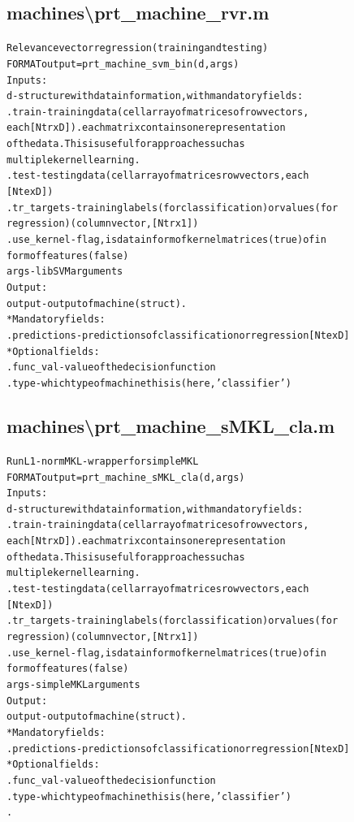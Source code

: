 \subsection{machines\textbackslash prt\_machine\_rvr.m}
\begin{alltt}

 Relevance vector regression (training and testing)
 FORMAT output = prt\_machine\_svm\_bin(d,args)
 Inputs:
   d         - structure with data information, with mandatory fields:
     .train      - training data (cell array of matrices of row vectors,
                   each [Ntr x D]). each matrix contains one representation
                   of the data. This is useful for approaches such as
                   multiple kernel learning.
     .test       - testing data  (cell array of matrices row vectors, each
                   [Nte x D])
     .tr\_targets - training labels (for classification) or values (for
                   regression) (column vector, [Ntr x 1])
     .use\_kernel - flag, is data in form of kernel matrices (true) of in
                form of features (false)
    args     - libSVM arguments
 Output:
    output  - output of machine (struct).
     * Mandatory fields:
      .predictions - predictions of classification or regression [Nte x D]
     * Optional fields:
      .func\_val - value of the decision function
      .type     - which type of machine this is (here, 'classifier')
\end{alltt}


\subsection{machines\textbackslash prt\_machine\_sMKL\_cla.m}
\begin{alltt}

 Run L1-norm MKL - wrapper for simpleMKL
 FORMAT output = prt\_machine\_sMKL\_cla(d,args)
 Inputs:
   d         - structure with data information, with mandatory fields:
     .train      - training data (cell array of matrices of row vectors,
                   each [Ntr x D]). each matrix contains one representation
                   of the data. This is useful for approaches such as
                   multiple kernel learning.
     .test       - testing data  (cell array of matrices row vectors, each
                   [Nte x D])
     .tr\_targets - training labels (for classification) or values (for
                   regression) (column vector, [Ntr x 1])
     .use\_kernel - flag, is data in form of kernel matrices (true) of in 
                form of features (false)
    args     - simpleMKL arguments
 Output:
    output  - output of machine (struct).
     * Mandatory fields:
      .predictions - predictions of classification or regression [Nte x D]
     * Optional fields:
      .func\_val - value of the decision function
      .type     - which type of machine this is (here, 'classifier')
      .
\end{alltt}


